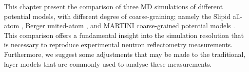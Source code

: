 This chapter present the comparison of three MD simulations of different potential models, with different degree of coarse-graining; namely the Slipid all-atom \cite{jambeck_derivation_2012}, Berger united-atom \cite{berger_molecular_1997}, and MARTINI coarse-grained potential models \cite{marrink_martini_2007}.
This comparison offers a fundamental insight into the simulation resolution that is necessary to reproduce experimental neutron reflectometry measurements.
Furthermore, we suggest some adjustments that may be made to the traditional, layer models that are commonly used to analyse these measurements.
